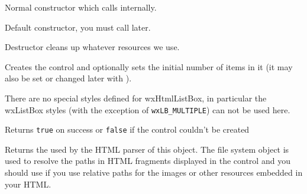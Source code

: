 

\label{wxhtmllistboxwxhtmllistbox}


Normal constructor which calls 
internally.


Default constructor, you must call 
later.


\label{wxhtmllistboxdtor}


Destructor cleans up whatever resources we use.


\label{wxhtmllistboxcreate}


Creates the control and optionally sets the initial number of items in it
(it may also be set or changed later with
).

There are no special styles defined for wxHtmlListBox, in particular the
wxListBox styles (with the exception of {\tt wxLB\_MULTIPLE}) can not be used here.

Returns {\tt true} on success or {\tt false} if the control couldn't be created


\label{wxhtmllistboxgetfilesystem}



Returns the  used by the HTML parser of
this object. The file system object is used to resolve the paths in HTML
fragments displayed in the control and you should use
 if you use
relative paths for the images or other resources embedded in your HTML.


